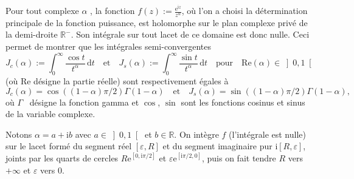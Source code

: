 \documentclass{aomart}
\begin{document}
Pour tout complexe $\alpha$ , la fonction $f(z):=\frac {{\mathrm {e}
    }^{\mathrm {i} z}}{z^{\alpha }}$, où l'on a choisi la
détermination principale de la fonction puissance, est holomorphe sur
le plan complexe privé de la demi-droite $ \mathbb {R} ^{-}$. Son
intégrale sur tout lacet de ce domaine est donc nulle. Ceci permet de
montrer que les intégrales semi-convergentes
\begin{displaymath}
J_{c}(\alpha ):=\int _{0}^{\infty }{\frac {\cos t}{t^{\alpha
    }}}\,\mathrm {d} t\quad {\text{et}}\quad J_{s}(\alpha ):=\int
_{0}^{\infty }{\frac {\sin t}{t^{\alpha }}}\,\mathrm {d} t\quad
{\text{pour}}\quad \mathrm {Re} (\alpha )\in \left]0,1\right[
\end{displaymath}
(où $\mathrm {Re}$ désigne la partie réelle) sont respectivement
égales à
\begin{displaymath}
J_{c}(\alpha )=\cos((1-\alpha )\pi /2)\Gamma (1-\alpha )\quad
{\text{et}}\quad J_{s}(\alpha )=\sin((1-\alpha )\pi /2)\Gamma
(1-\alpha ),
\end{displaymath}
où $\Gamma$ \  désigne la fonction gamma et  $\cos$, $\sin$ sont les
fonctions cosinus et sinus de la variable complexe.

Notons $\alpha =a+\mathrm {i} b$ avec $a\in \left]0,1\right[$ et $b\in
\mathbb {R}$. On intègre $f$ (l'intégrale est nulle) sur le lacet
formé du segment réel $\left[\varepsilon ,R\right]$ et du segment
imaginaire pur $\mathrm {i} \left[R,\varepsilon \right]$, joints par
les quarts de cercles $R\mathrm {e} ^{\left[0,\mathrm {i} \pi
    /2\right]}$ et $\varepsilon \mathrm {e} ^{\left[\mathrm {i} \pi /2,0\right]}$, puis on fait tendre $R$ vers $ +\infty $ et $\varepsilon$  vers $0$.
\end{document}
